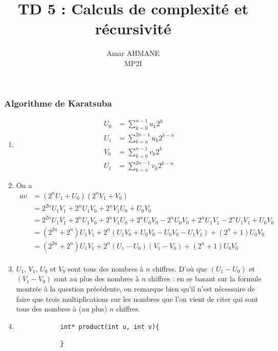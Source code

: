 \documentclass[10pt]{article}
\title{\textbf{TD 5 : Calculs de complexité et récursivité}}
\author{Amar AHMANE \\ MP2I}
\date{}
\begin{document}
	\maketitle
	\subsubsection*{Algorithme de Karatsuba}
	\begin{enumerate}[start=5,label={\bfseries \arabic*}]
		\item 
		\begin{align*}
			U_0&=\sum_{k=0}^{n-1}u_k2^k\\
			U_1&=\sum_{k=n}^{2n-1}u_k2^{k-n}\\
			V_0&=\sum_{k=0}^{n-1}v_k2^k\\
			U_1&=\sum_{k=n}^{2n-1}v_k2^{k-n}
		\end{align*}
		\item On a 
		\begin{align*}
			uv &= (2^nU_1+U_0)(2^nV_1+V_0)\\
			   &= 2^{2n}U_1V_1+2^nU_1V_0+2^nV_1U_0+U_0V_0\\
			   &= 2^{2n}U_1V_1+2^nU_1V_0+2^nV_1U_0+2^nU_0V_0-2^nU_0V_0+2^nU_1V_1-2^nU_1V_1+U_0V_0\\
			   &= (2^{2n}+2^n)U_1V_1+2^n(U_1V_0+U_0V_0-U_0V_0-U_1V_1)+(2^n+1)U_0V_0\\
			   &= (2^{2n}+2^n)U_1V_1+2^n(U_1-U_0)(V_1-V_0)+(2^n+1)U_0V_0\\
		\end{align*}
		\item $U_1$, $V_1$, $U_0$ et $V_0$ sont tous des nombres à $n$ chiffres. D'où que $(U_1-U_0)$ et $(V_1-V_0)$ sont au plus des nombres à $n$ chiffres : en se basant sur la formule montrée à la question précédente, on remarque bien qu'il n'est nécessaire de faire que trois multiplications sur les nombres que l'on vient de citer qui sont tous des nombres à (au plus) $n$ chiffres.
		\item
		\begin{lstlisting}
			int* product(int u, int v){

			}
		\end{lstlisting}
	\end{enumerate} 
\end{document}
